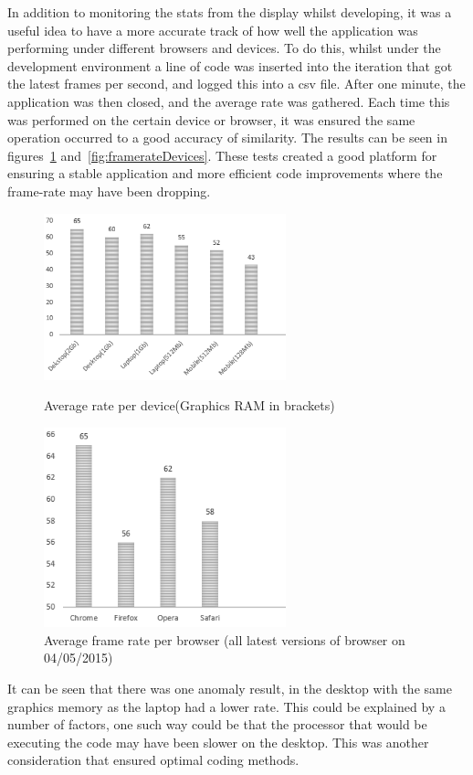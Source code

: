 In addition to monitoring the stats from the display whilst developing, it was a useful idea to have a more accurate track of how well the application was performing under different browsers and devices. To do this, whilst under the development environment a line of code was inserted into the iteration that got the latest frames per second, and logged this into a csv file. After one minute, the application was then closed, and the average rate was gathered. Each time this was performed on the certain device or browser, it was ensured the same operation occurred to a good accuracy of similarity. The results can be seen in figures~\ref{fig:framerateDevicesBrowsers} and~\ref{fig:framerateDevices}. These tests created a good platform for ensuring a stable application and more efficient code improvements where the frame-rate may have been dropping.

\begin{figure}[h!]
\centering
\parbox{7cm}{
\includegraphics[width=7cm]{images/fpsMeasured.png}
\caption{Average rate per device(Graphics RAM in brackets)}
\label{fig:framerateDevices}}
\qquad
\begin{minipage}{7cm}
\includegraphics[width=7cm]{images/fpsMeasuredBrowsers.png}
\caption{Average frame rate per browser (all latest versions of browser on 04/05/2015)}
\label{fig:framerateDevicesBrowsers}
\end{minipage}
\end{figure}

It can be seen that there was one anomaly result, in the desktop with the same graphics memory as the laptop had a lower rate. This could be explained by a number of factors, one such way could be that the processor that would be executing the code may have been slower on the desktop. This was another consideration that ensured optimal coding methods.

